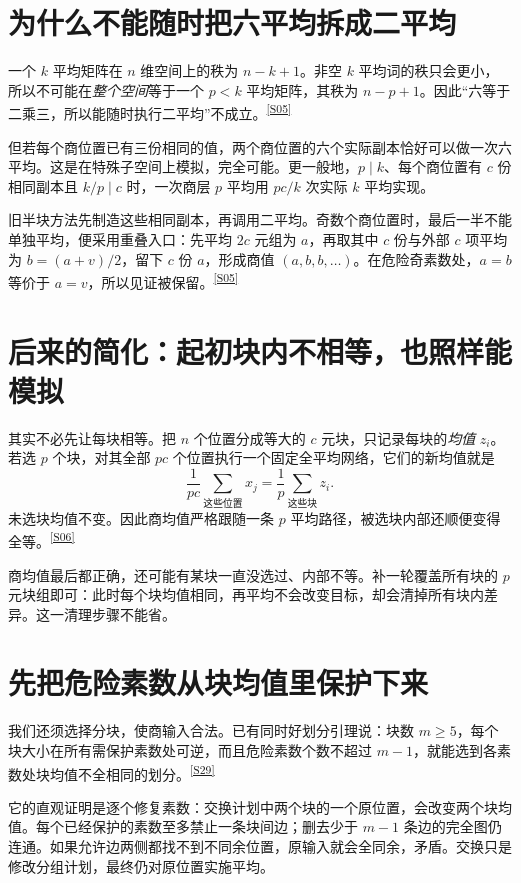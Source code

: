 \documentclass[11pt,a4paper,oneside,openany]{book}
\newcommand{\src}[1]{\textsuperscript{\hyperref[source:#1]{[#1]}}}
\theoremstyle{definition}\newtheorem{example}[theorem]{例}\newtheorem{conjecture}[theorem]{猜想}
\numberwithin{equation}{chapter}\setcounter{tocdepth}{1}
\begin{document}
\section{为什么不能随时把六平均拆成二平均}
一个 $k$ 平均矩阵在 $n$ 维空间上的秩为 $n-k+1$。非空 $k$ 平均词的秩只会更小，所以不可能在\emph{整个空间}等于一个 $p<k$ 平均矩阵，其秩为 $n-p+1$。因此“六等于二乘三，所以能随时执行二平均”不成立。\src{S05}

但若每个商位置已有三份相同的值，两个商位置的六个实际副本恰好可以做一次六平均。这是在特殊子空间上模拟，完全可能。更一般地，$p\mid k$、每个商位置有 $c$ 份相同副本且 $k/p\mid c$ 时，一次商层 $p$ 平均用 $pc/k$ 次实际 $k$ 平均实现。

旧半块方法先制造这些相同副本，再调用二平均。奇数个商位置时，最后一半不能单独平均，便采用重叠入口：先平均 $2c$ 元组为 $a$，再取其中 $c$ 份与外部 $c$ 项平均为 $b=(a+v)/2$，留下 $c$ 份 $a$，形成商值 $(a,b,b,\ldots)$。在危险奇素数处，$a=b$ 等价于 $a=v$，所以见证被保留。\src{S05}

\section{后来的简化：起初块内不相等，也照样能模拟}
其实不必先让每块相等。把 $n$ 个位置分成等大的 $c$ 元块，只记录每块的\emph{均值} $z_i$。若选 $p$ 个块，对其全部 $pc$ 个位置执行一个固定全平均网络，它们的新均值就是
\[\frac1{pc}\sum_{\text{这些位置}}x_j=\frac1p\sum_{\text{这些块}}z_i.
\]
未选块均值不变。因此商均值严格跟随一条 $p$ 平均路径，被选块内部还顺便变得全等。\src{S06}

商均值最后都正确，还可能有某块一直没选过、内部不等。补一轮覆盖所有块的 $p$ 元块组即可：此时每个块均值相同，再平均不会改变目标，却会清掉所有块内差异。这一清理步骤不能省。

\section{先把危险素数从块均值里保护下来}
我们还须选择分块，使商输入合法。已有同时好划分引理说：块数 $m\ge5$，每个块大小在所有需保护素数处可逆，而且危险素数个数不超过 $m-1$，就能选到各素数处块均值不全相同的划分。\src{S29}

它的直观证明是逐个修复素数：交换计划中两个块的一个原位置，会改变两个块均值。每个已经保护的素数至多禁止一条块间边；删去少于 $m-1$ 条边的完全图仍连通。如果允许边两侧都找不到不同余位置，原输入就会全同余，矛盾。交换只是修改分组计划，最终仍对原位置实施平均。
\end{document}
